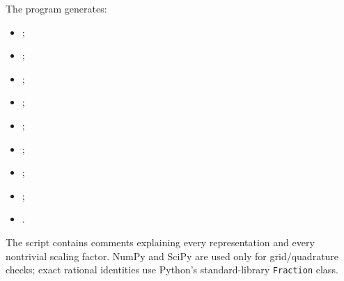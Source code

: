 \documentclass[11pt,oneside]{article}
\theoremstyle{definition}
\theoremstyle{remark}
\newcommand{\1}{\mathbf 1}
\begin{document}
The program generates:
\begin{itemize}
\item {};
\item {};
\item {};
\item {};
\item {};
\item {};
\item {};
\item {};
\item {}.
\end{itemize}
The script contains comments explaining every representation and every nontrivial scaling
factor.  NumPy and SciPy are used only for grid/quadrature checks; exact rational identities
use Python's standard-library \texttt{Fraction} class.
\end{document}
